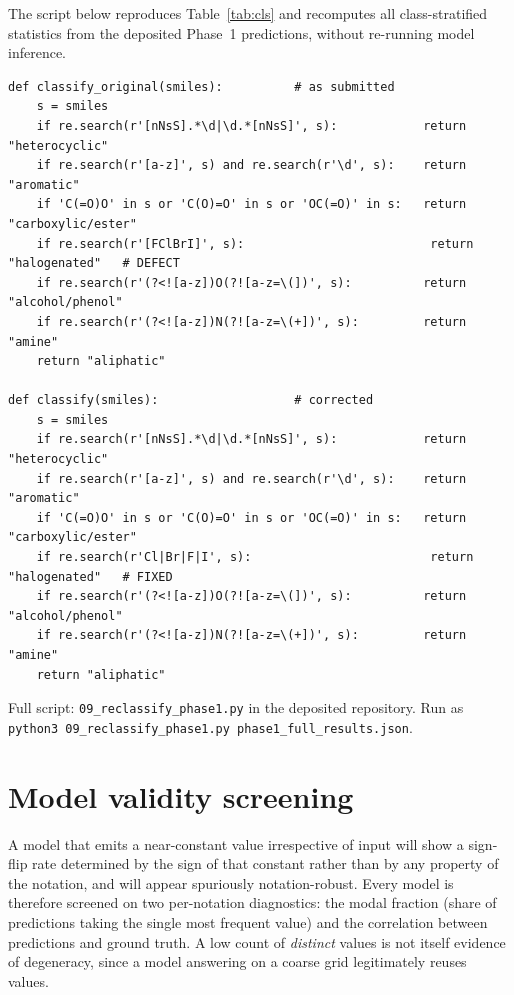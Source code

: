 \documentclass[11pt,a4paper]{article}
\begin{document}
\noindent The script below reproduces Table~\ref{tab:cls} and recomputes all class-stratified
statistics from the deposited Phase~1 predictions, without re-running model inference.

\begin{lstlisting}
def classify_original(smiles):          # as submitted
    s = smiles
    if re.search(r'[nNsS].*\d|\d.*[nNsS]', s):            return "heterocyclic"
    if re.search(r'[a-z]', s) and re.search(r'\d', s):    return "aromatic"
    if 'C(=O)O' in s or 'C(O)=O' in s or 'OC(=O)' in s:   return "carboxylic/ester"
    if re.search(r'[FClBrI]', s):                          return "halogenated"   # DEFECT
    if re.search(r'(?<![a-z])O(?![a-z=\(])', s):          return "alcohol/phenol"
    if re.search(r'(?<![a-z])N(?![a-z=\(+])', s):         return "amine"
    return "aliphatic"

def classify(smiles):                   # corrected
    s = smiles
    if re.search(r'[nNsS].*\d|\d.*[nNsS]', s):            return "heterocyclic"
    if re.search(r'[a-z]', s) and re.search(r'\d', s):    return "aromatic"
    if 'C(=O)O' in s or 'C(O)=O' in s or 'OC(=O)' in s:   return "carboxylic/ester"
    if re.search(r'Cl|Br|F|I', s):                         return "halogenated"   # FIXED
    if re.search(r'(?<![a-z])O(?![a-z=\(])', s):          return "alcohol/phenol"
    if re.search(r'(?<![a-z])N(?![a-z=\(+])', s):         return "amine"
    return "aliphatic"
\end{lstlisting}

\noindent Full script: \texttt{09\_reclassify\_phase1.py} in the deposited repository. Run as
\texttt{python3 09\_reclassify\_phase1.py phase1\_full\_results.json}.

\section{Model validity screening}

A model that emits a near-constant value irrespective of input will show a sign-flip rate determined
by the sign of that constant rather than by any property of the notation, and will appear spuriously
notation-robust. Every model is therefore screened on two per-notation diagnostics: the modal
fraction (share of predictions taking the single most frequent value) and the correlation between
predictions and ground truth. A low count of \emph{distinct} values is not itself evidence of
degeneracy, since a model answering on a coarse grid legitimately reuses values.
\end{document}
